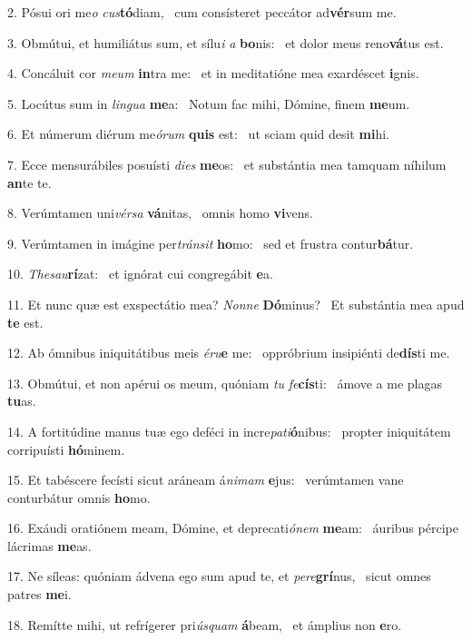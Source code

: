 2. Pósui ori me\textit{o} \textit{cus}\textbf{tó}diam, \ast\  cum consísteret peccátor ad\textbf{vér}sum me.\

3. Obmútui, et humiliátus sum, et sílu\textit{i} \textit{a} \textbf{bo}nis: \ast\  et dolor meus reno\textbf{vá}tus est.\

4. Concáluit cor \textit{me}\textit{um} \textbf{in}tra me: \ast\  et in meditatióne mea exardéscet \textbf{i}gnis.\

5. Locútus sum in \textit{lin}\textit{gua} \textbf{me}a: \ast\  Notum fac mihi, Dómine, finem \textbf{me}um.\

6. Et númerum diérum me\textit{ó}\textit{rum} \textbf{quis} est: \ast\  ut sciam quid desit \textbf{mi}hi.\

7. Ecce mensurábiles posuísti \textit{di}\textit{es} \textbf{me}os: \ast\  et substántia mea tamquam níhilum \textbf{an}te te.\

8. Verúmtamen uni\textit{vér}\textit{sa} \textbf{vá}nitas, \ast\  omnis homo \textbf{vi}vens.\

9. Verúmtamen in imágine per\textit{tráns}\textit{it} \textbf{ho}mo: \ast\  sed et frustra contur\textbf{bá}tur.\

10. \textit{The}\textit{sau}\textbf{rí}zat: \ast\  et ignórat cui congregábit \textbf{e}a.\

11. Et nunc quæ est exspectátio mea? \textit{Non}\textit{ne} \textbf{Dó}minus? \ast\  Et substántia mea apud \textbf{te} est.\

12. Ab ómnibus iniquitátibus meis \textit{é}\textit{ru}\textbf{e} me: \ast\  oppróbrium insipiénti de\textbf{dís}ti me.\

13. Obmútui, et non apérui os meum, quóniam \textit{tu} \textit{fe}\textbf{cís}ti: \ast\  ámove a me plagas \textbf{tu}as.\

14. A fortitúdine manus tuæ ego deféci in incre\textit{pa}\textit{ti}\textbf{ó}nibus: \ast\  propter iniquitátem corripuísti \textbf{hó}minem.\

15. Et tabéscere fecísti sicut aráneam á\textit{ni}\textit{mam} \textbf{e}jus: \ast\  verúmtamen vane conturbátur omnis \textbf{ho}mo.\

16. Exáudi oratiónem meam, Dómine, et deprecati\textit{ó}\textit{nem} \textbf{me}am: \ast\  áuribus pércipe lácrimas \textbf{me}as.\

17. Ne síleas: quóniam ádvena ego sum apud te, et \textit{per}\textit{e}\textbf{grí}nus, \ast\  sicut omnes patres \textbf{me}i.\

18. Remítte mihi, ut refrígerer pri\textit{ús}\textit{quam} \textbf{á}beam, \ast\  et ámplius non \textbf{e}ro.\

